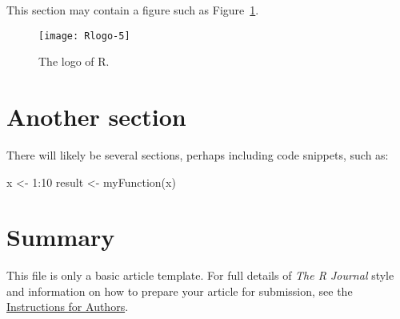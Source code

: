 This section may contain a figure such as Figure~\ref{figure:rlogo}.

\begin{figure}[htbp]
  \centering
  \texttt{[image: Rlogo-5]}
  \caption{The logo of R.}
  \label{figure:rlogo}
\end{figure}

\section{Another section}

There will likely be several sections, perhaps including code snippets, such as:

\begin{example}
  x <- 1:10
  result <- myFunction(x)
\end{example}

\section{Summary}

This file is only a basic article template. For full details of \emph{The R Journal} style and information on how to prepare your article for submission, see the \href{https://journal.r-project.org/share/author-guide.pdf}{Instructions for Authors}.



\address{Author One\\
  Affiliation\\
  Address\\
  Country\\
  (ORCiD if desired)\\
  }

\address{Author Two\\
  Affiliation\\
  Address\\
  Country\\
  (ORCiD if desired)\\
  }

\address{Author Three\\
  Affiliation\\
  Address\\
  Country\\
  (ORCiD if desired)\\
  }
